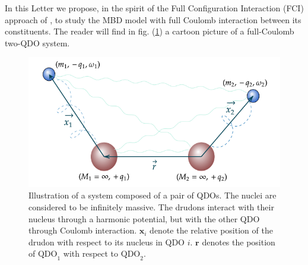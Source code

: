 \documentclass[reprint, amsmath, amssymb, floatfix, aps, pra]{revtex4-2}
\begin{document}
    In this Letter we propose, in the spirit of the Full Configuration Interaction (FCI) approach of \cite{sadhukhan2016quantum}, to study the MBD model with full Coulomb interaction between its constituents. The reader will find in fig. (\ref{fig:qdos}) a cartoon picture of a full-Coulomb two-QDO system.

    \begin{figure}
        \includegraphics[scale=0.39]{figures/qdos.png}
        \caption{\label{fig:qdos}Illustration of a system composed of a pair of QDOs. The nuclei are considered to be infinitely massive. The drudons interact with their nucleus through a harmonic potential, but with the other QDO through Coulomb interaction. $\bm x_i$ denote the relative position of the drudon with respect to its nucleus in QDO $i$. $\bm r$ denotes the position of $\text{QDO}_1$ with respect to $\text{QDO}_2$.}
    \end{figure}
\end{document}
